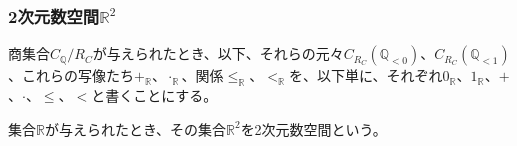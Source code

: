 \documentclass[dvipdfmx]{jsarticle}
\begin{document}
\subsubsection{2次元数空間$\mathbb{R}^{2}$}%
\begin{dfn}
商集合$C_{\mathbb{Q}} /R_{C} $が与えられたとき、以下、それらの元々$C_{R_{C}}\left( \mathbb{Q}_{< 0} \right)$、$C_{R_{C}}\left( \mathbb{Q}_{< 1} \right)$、これらの写像たち$+_{\mathbb{R}}$、$\cdot_{\mathbb{R}}$、関係$\leq_{\mathbb{R}}$、$<_{\mathbb{R}}$を、以下単に、それぞれ$0_{\mathbb{R}}$、$1_{\mathbb{R}}$、$+$、$\cdot$、$\leq$、$<$と書くことにする。
\end{dfn}
\begin{dfn}
集合$\mathbb{R}$が与えられたとき、その集合$\mathbb{R}^{2}$を2次元数空間という。
\end{dfn}
\end{document}
